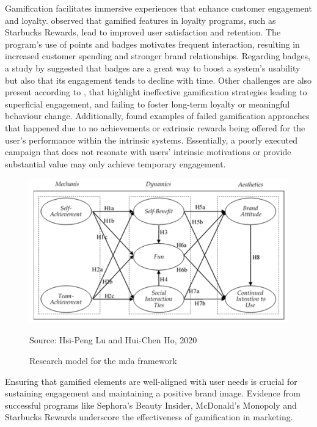 Gamification facilitates immersive experiences that enhance customer engagement and loyalty. 
\textcite{doesItWork} observed that gamified features in loyalty programs, such as Starbucks Rewards, lead to improved user satisfaction and retention. 
The program’s use of points and badges motivates frequent interaction, resulting in increased customer spending and stronger brand relationships. 
Regarding badges, a study by \textcite{badges} suggested that badges are a great way to boost a system's usability but also that its engagement tends to decline with time. 
Other challenges are also present according to \textcite{nicholson2015}, that highlight ineffective gamification strategies leading to superficial engagement, and failing to foster long-term loyalty or meaningful behaviour change. 
Additionally, \textcite{gameon} found examples of failed gamification approaches that happened due to no achievements or extrinsic rewards being offered for the user's performance within the intrinsic systems. 
Essentially, a poorly executed campaign that does not resonate with users' intrinsic motivations or provide substantial value may only achieve temporary engagement. 
\begin{figure}[htbp]
  \centering
  \includegraphics[width=\textwidth]{Media/sustainability2.png}
  \caption{Research model for the \acrshort{mda} framework}
  \label{fig:explainedDataChart}
{\raggedright \small{Source: Hsi-Peng Lu and Hui-Chen Ho, 2020}\par}
\end{figure}
Ensuring that gamified elements are well-aligned with user needs is crucial for sustaining engagement and maintaining a positive brand image.
Evidence from successful programs like Sephora’s Beauty Insider, McDonald's Monopoly and Starbucks Rewards underscore the effectiveness of gamification in marketing.

